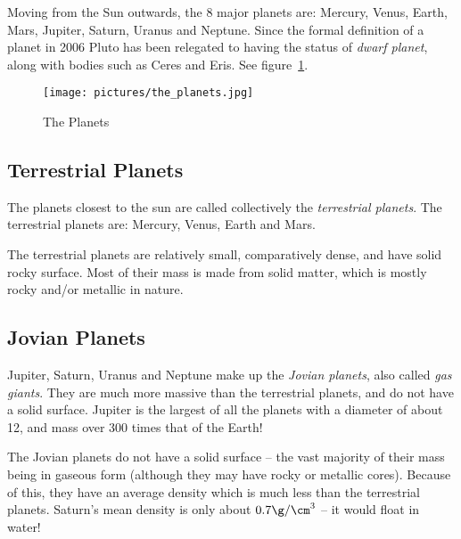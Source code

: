 Moving from the Sun outwards, the 8 major planets are: Mercury, Venus,
Earth, Mars, Jupiter, Saturn, Uranus and Neptune. Since the formal
definition of a planet in 2006 Pluto has been relegated to having the
status of \emph{dwarf planet}, along with bodies such as Ceres and Eris.
See figure~\ref{fig:planets}.

\begin{figure}[t]
  \centering
  \texttt{[image: pictures/the\_planets.jpg]}
  \caption{The Planets}
  \label{fig:planets}
\end{figure}


\subsection{Terrestrial Planets}%

The planets closest to the sun are called collectively the
\emph{terrestrial planets}. The terrestrial planets are: Mercury, Venus,
Earth and Mars.

The terrestrial planets are relatively small, comparatively dense, and
have solid rocky surface. Most of their mass is made from solid matter,
which is mostly rocky and/or metallic in nature.

\subsection{Jovian Planets}%

Jupiter, Saturn, Uranus and Neptune make up the \emph{Jovian planets},
also called \emph{gas giants}. They are much more massive than the
terrestrial planets, and do not have a solid surface. Jupiter is the
largest of all the planets with a diameter of about 12, and mass over
300 times that of the Earth!

The Jovian planets do not have a solid surface -- the vast majority of
their mass being in gaseous form (although they may have rocky or
metallic cores). Because of this, they have an average density which is
much less than the terrestrial planets. Saturn's mean density is only
about $0.7 \g/\cm^3$ -- it would float in water!

